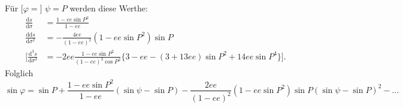 \noindent Für [\(\varphi=\)] \(\psi=P\) werden diese Werthe:
\[
\begin{aligned}
\frac{\mathrm ds}{\mathrm d\sigma}
&=\frac{1-ee\sin P^2}{1-ee}\\
\frac{\mathrm{dd}s}{\mathrm d\sigma^2}
&=-\frac{4ee}{(1-ee)^2}(1-ee\sin P^2)\sin P\\
\mathopen{\Big[}\frac{\mathrm d^3s}{\mathrm d\sigma^3}
&=-2ee\frac{1-ee\sin P^2}{(1-ee)^3\cos P^2}
\{3-ee-(3+13ee)\sin P^2+14ee\sin P^4\}\Big].
\end{aligned}
\]
\noindent Folglich
\[
\sin\varphi=\sin P+\frac{1-ee\sin P^2}{1-ee}(\sin\psi-\sin P)
-\frac{2ee}{(1-ee)^2}(1-ee\sin P^2)\sin P(\sin\psi-\sin P)^2-\ldots
\]

\par\clearpage
\noindent\makebox[12mm][l]{}\par\medskip

